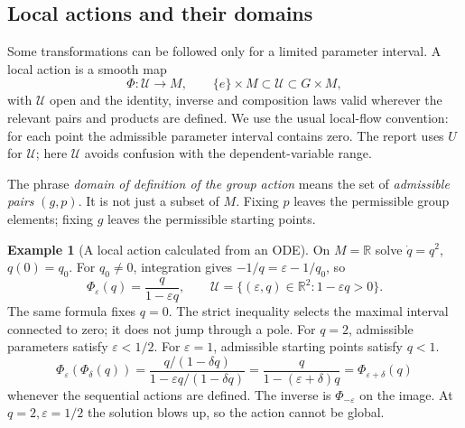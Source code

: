 \documentclass[11pt,a4paper]{article}
\numberwithin{equation}{section}
\theoremstyle{definition}
\newtheorem{example}[definition]{Example}
\theoremstyle{plain}
\theoremstyle{remark}
\newcommand{\R}{\mathbb R}
\begin{document}
\subsection{Local actions and their domains}\label{sec:local}
Some transformations can be followed only for a limited parameter interval. A local action is a smooth map
\begin{equation}\label{eq:local-action}
\Phi:\mathcal U\longrightarrow M,\qquad
\{e\}\times M\subset\mathcal U\subset G\times M,
\end{equation}
with $\mathcal U$ open and the identity, inverse and composition laws valid wherever the relevant pairs and products are defined. We use the usual local-flow convention: for each point the admissible parameter interval contains zero. The report uses $U$ for $\mathcal U$; here $\mathcal U$ avoids confusion with the dependent-variable range.

The phrase \emph{domain of definition of the group action} means the set of \emph{admissible pairs} $(g,p)$. It is not just a subset of $M$. Fixing $p$ leaves the permissible group elements; fixing $g$ leaves the permissible starting points.

\begin{example}[A local action calculated from an ODE]
On $M=\R$ solve $\dot q=q^2$, $q(0)=q_0$. For $q_0\ne0$, integration gives $-1/q=\varepsilon-1/q_0$, so
\[
\Phi_\varepsilon(q)=\frac{q}{1-\varepsilon q},\qquad
\mathcal U=\{(\varepsilon,q)\in\R^2:1-\varepsilon q>0\}.
\]
The same formula fixes $q=0$. The strict inequality selects the maximal interval connected to zero; it does not jump through a pole. For $q=2$, admissible parameters satisfy $\varepsilon<1/2$. For $\varepsilon=1$, admissible starting points satisfy $q<1$.
\[
\Phi_\varepsilon(\Phi_\delta(q))
=\frac{q/(1-\delta q)}{1-\varepsilon q/(1-\delta q)}
=\frac{q}{1-(\varepsilon+\delta)q}
=\Phi_{\varepsilon+\delta}(q)
\]
whenever the sequential actions are defined. The inverse is $\Phi_{-\varepsilon}$ on the image. At $q=2,\varepsilon=1/2$ the solution blows up, so the action cannot be global.
\end{example}
\end{document}
